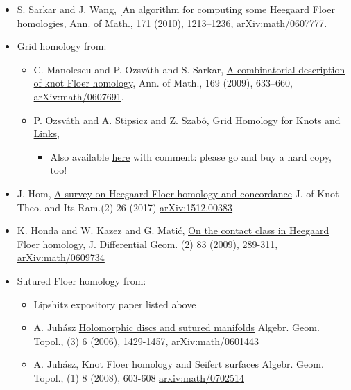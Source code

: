 \begin{itemize}
\item
  \autocite{SW} S. Sarkar and J. Wang, {[}An algorithm for computing
  some Heegaard Floer homologies, Ann. of Math., 171 (2010), 1213--1236,
  \href{https://arxiv.org/abs/math/0607777}{arXiv:math/0607777}.
\item
  Grid homology from:

  \begin{itemize}
  \item
    C. Manolescu and P. Ozsváth and S. Sarkar,
    \href{https://annals.math.princeton.edu/wp-content/uploads/annals-v169-n2-p07.pdf}{A
    combinatorial description of knot Floer homology}, Ann. of Math.,
    169 (2009), 633--660,
    \href{https://arxiv.org/abs/math/0607691}{arXiv:math/0607691}.
  \item
    P. Ozsváth and A. Stipsicz and Z. Szabó,
    \href{https://bookstore.ams.org/surv-208}{Grid Homology for Knots
    and Links},

    \begin{itemize}
    \tightlist
    \item
      Also available
      \href{https://web.math.princeton.edu/~petero/GridHomologyBook.pdf}{here}
      with comment: please go and buy a hard copy, too!
    \end{itemize}
  \end{itemize}
\item
  J. Hom,
  \href{https://www.worldscientific.com/doi/abs/10.1142/S0218216517400156}{A
  survey on Heegaard Floer homology and concordance} J. of Knot Theo.
  and Its Ram.(2) 26 (2017)
  \href{https://arxiv.org/abs/1512.00383}{arXiv:1512.00383}
\item
  K. Honda and W. Kazez and G. Matić,
  \href{https://projecteuclid.org/euclid.jdg/1261495333}{On the contact
  class in Heegaard Floer homology}, J. Differential Geom. (2) 83
  (2009), 289-311,
  \href{https://arxiv.org/abs/math/0609734}{arXiv:math/0609734}
\item
  Sutured Floer homology from:

  \begin{itemize}
  \tightlist
  \item
    \autocite{L} Lipshitz expository paper listed above
  \item
    A. Juhász
    \href{https://projecteuclid.org/euclid.agt/1513796585}{Holomorphic
    discs and sutured manifolds} Algebr. Geom. Topol., (3) 6 (2006),
    1429-1457,
    \href{https://arxiv.org/abs/math/0601443}{arXiv:math/0601443}
  \item
    A. Juhász,
    \href{https://projecteuclid.org/euclid.agt/1513796824}{Knot Floer
    homology and Seifert surfaces} Algebr. Geom. Topol., (1) 8 (2008),
    603-608
    \href{https://arxiv.org/abs/math/0702514}{arxiv:math/0702514}
  \end{itemize}
\end{itemize}

